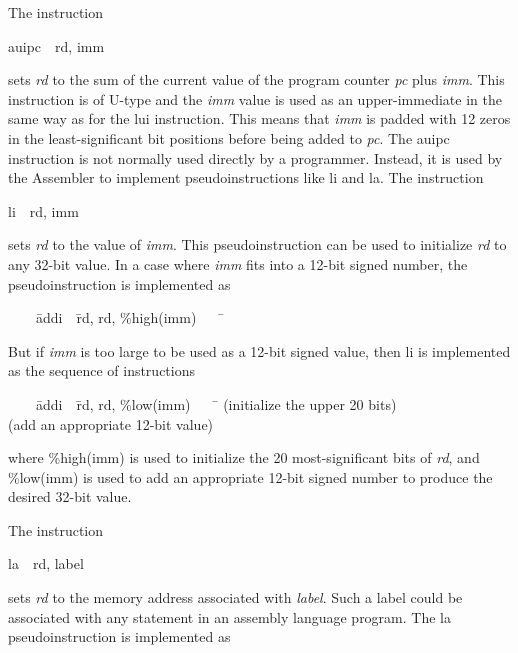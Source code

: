 \documentclass[11pt, twoside, pdftex]{article}
\newenvironment{ctabbing}%
{\begin{center}\begin{minipage}{\textwidth}\begin{tabbing}}
{\end{tabbing}\end{minipage}\end{center}}
\begin{document}
The instruction
\vspace{-\baselineskip}
\begin{center}
{\sf auipc~~rd, imm}
\end{center}
\noindent
sets {\it rd} to the sum of the current value of the program counter {\it pc} plus {\it imm}. 
This instruction is of U-type and the {\it imm} value is used as an upper-immediate in the 
same way as for the {\sf lui}
instruction. This means that {\it imm} is padded with 12 zeros in the least-significant bit 
positions before being added to {\it pc}. The {\sf auipc} instruction is not normally used
directly by a programmer. Instead, it is used by the Assembler to implement pseudoinstructions
like {\sf li} and {\sf la}.  The instruction
\vspace{-\baselineskip}
\begin{center}
{\sf li~~rd, imm}
\end{center}
\noindent
sets {\it rd} to the value of {\it imm}. This pseudoinstruction can be used to initialize
{\it rd} to any 32-bit value. In a case where {\it imm} fits into a 12-bit signed number, 
the pseudoinstruction is implemented as
\begin{ctabbing}
~~~~\={\sf addi}~~\={\sf rd, rd, \%high(imm)}~~~~\=\kill
{}
\end{ctabbing}
\vspace{-\baselineskip}
But if {\it imm} is too large to be used as a 12-bit signed value, then
{\sf li} is implemented as the sequence of instructions
\begin{ctabbing}
~~~~\={\sf addi}~~\={\sf rd, rd, \%low(imm)}~~~~\=\kill
{}  \>(initialize the upper 20 bits)\\
  \>(add an appropriate 12-bit value)\\
\end{ctabbing}
\vspace{-\baselineskip}
where {\sf \%high(imm)} is used to initialize the 20 most-significant bits of {\it rd}, and 
{\sf \%low(imm)} is used to add an appropriate 12-bit signed number to produce the desired 
32-bit value.

\noindent
The instruction
\vspace{-\baselineskip}
\begin{center}
{\sf la~~rd, label}
\end{center}
\vspace{-\baselineskip}
\noindent
sets {\it rd} to the memory address associated with {\it label}.  Such a label could be
associated with any statement in an assembly language program. The {\sf la} pseudoinstruction 
is implemented as
\end{document}
